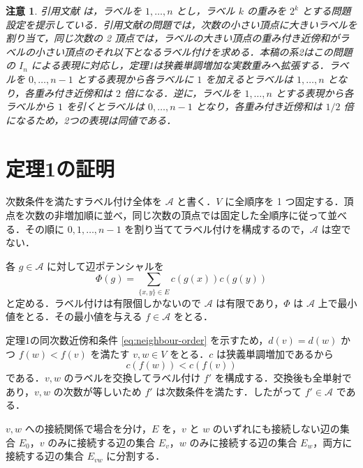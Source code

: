 \documentclass[lualatex,article]{jlreq}
\theoremstyle{jremark}
\newtheorem*{remark}{注意}
\begin{document}
\begin{remark}
  引用文献 \cite{smooth-pudding-2024} は，ラベルを $1,\ldots,n$ とし，ラベル $k$ の重みを $2^k$ とする問題設定を提示している．引用文献の問題では，次数の小さい頂点に大きいラベルを割り当て，同じ次数の 2 頂点では，ラベルの大きい頂点の重み付き近傍和がラベルの小さい頂点のそれ以下となるラベル付けを求める．本稿の系2はこの問題の $I_n$ による表現に対応し，定理1は狭義単調増加な実数重みへ拡張する．ラベルを $0,\ldots,n-1$ とする表現から各ラベルに $1$ を加えるとラベルは $1,\ldots,n$ となり，各重み付き近傍和は $2$ 倍になる．逆に，ラベルを $1,\ldots,n$ とする表現から各ラベルから $1$ を引くとラベルは $0,\ldots,n-1$ となり，各重み付き近傍和は $1/2$ 倍になるため，2つの表現は同値である．
\end{remark}

\section{定理1の証明}

次数条件を満たすラベル付け全体を $\mathcal A$ と書く．$V$ に全順序を 1 つ固定する．頂点を次数の非増加順に並べ，同じ次数の頂点では固定した全順序に従って並べる．その順に $0,1,\ldots,n-1$ を割り当ててラベル付けを構成するので，$\mathcal A$ は空でない．

各 $g\in\mathcal A$ に対して辺ポテンシャルを
\[
  \Phi(g)=\sum_{\{x,y\}\in E}c(g(x))c(g(y))
  \tag{3}\label{eq:potential}
\]
と定める．ラベル付けは有限個しかないので $\mathcal A$ は有限であり，$\Phi$ は $\mathcal A$ 上で最小値をとる．その最小値を与える $f\in\mathcal A$ をとる．

定理1の同次数近傍和条件 \eqref{eq:neighbour-order} を示すため，$d(v)=d(w)$ かつ $f(w)<f(v)$ を満たす $v,w\in V$ をとる．$c$ は狭義単調増加であるから
\[
  c(f(w))<c(f(v))
  \tag{4}\label{eq:weight-order}
\]
である．$v,w$ のラベルを交換してラベル付け $f'$ を構成する．交換後も全単射であり，$v,w$ の次数が等しいため $f'$ は次数条件を満たす．したがって $f'\in\mathcal A$ である．

$v,w$ への接続関係で場合を分け，$E$ を，$v$ と $w$ のいずれにも接続しない辺の集合 $E_0$，$v$ のみに接続する辺の集合 $E_v$，$w$ のみに接続する辺の集合 $E_w$，両方に接続する辺の集合 $E_{vw}$ に分割する．
\end{document}
